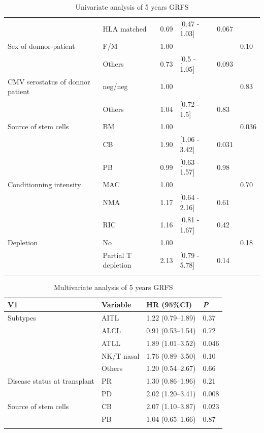 \documentclass[a4paper,11pt] {article}
\begin{document}
\begin{center}
\begin{landscape}
\begin{longtable}{llrlll}
   & HLA matched & 0.69 & [0.47 - 1.03] & 0.067 &  \\ 
  Sex of donnor-patient & F/M & 1.00 &  &  & 0.10 \\ 
   & Others & 0.73 & [0.5 - 1.05] & 0.093 &  \\ 
  CMV serostatus of donnor patient & neg/neg & 1.00 &  &  & 0.83 \\ 
   & Others & 1.04 & [0.72 - 1.5] & 0.83 &  \\ 
  Source of stem cells & BM & 1.00 &  &  & 0.036 \\ 
   & CB & 1.90 & [1.06 - 3.42] & 0.031 &  \\ 
   & PB & 0.99 & [0.63 - 1.57] & 0.98 &  \\ 
  Conditionning intensity & MAC & 1.00 &  &  & 0.70 \\ 
   & NMA & 1.17 & [0.64 - 2.16] & 0.61 &  \\ 
   & RIC & 1.16 & [0.81 - 1.67] & 0.42 &  \\ 
  Depletion & No & 1.00 &  &  & 0.18 \\ 
   & Partial T depletion & 2.13 & [0.79 - 5.78] & 0.14 &  \\ 
   \hline
\hline
\caption{Univariate analysis of 5 years GRFS} 
\label{tab:uos}
\end{longtable}


\begin{longtable}{llll}
  \hline
V1 & Variable & HR (95\%CI) & \emph{P} \\ 
  \hline
Subtypes & AITL & 1.22 (0.79--1.89) & 0.37 \\ 
   & ALCL & 0.91 (0.53--1.54) & 0.72 \\ 
   & ATLL & 1.89 (1.01--3.52) & 0.046 \\ 
   & NK/T nasal & 1.76 (0.89--3.50) & 0.10 \\ 
   & Others & 1.20 (0.54--2.67) & 0.66 \\ 
  Disease status at transplant & PR & 1.30 (0.86--1.96) & 0.21 \\ 
   & PD & 2.02 (1.20--3.41) & 0.008 \\ 
  Source of stem cells & CB & 2.07 (1.10--3.87) & 0.023 \\ 
   & PB & 1.04 (0.65--1.66) & 0.87 \\ 
   \hline
\hline
\caption{Multivariate analysis of 5 years GRFS} 
\label{tab:uos}
\end{longtable}\end{landscape}



\end{center}
\end{document}
